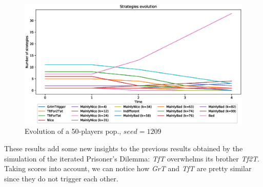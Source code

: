 \documentclass[journal,10pt,twoside]{IEEEtran}
\begin{document}
\begin{figure}[!ht]
    \centering
    \includegraphics[width=1\columnwidth]{../img/ripdmp-const/seed1209/ripdmp-evolution-const-pop-50}
    \caption{Evolution of a 50-players pop., $seed = 1209$}
    \label{fig:constRseed1209}
\end{figure}

These results add some new insights to the previous results obtained by the simulation of the iterated Prisoner's Dilemma: \textit{TfT} overwhelms its brother \textit{Tf2T}. Taking scores into account, we can notice how \textit{GrT} and \textit{TfT} are pretty similar since they do not trigger each other.
\end{document}
